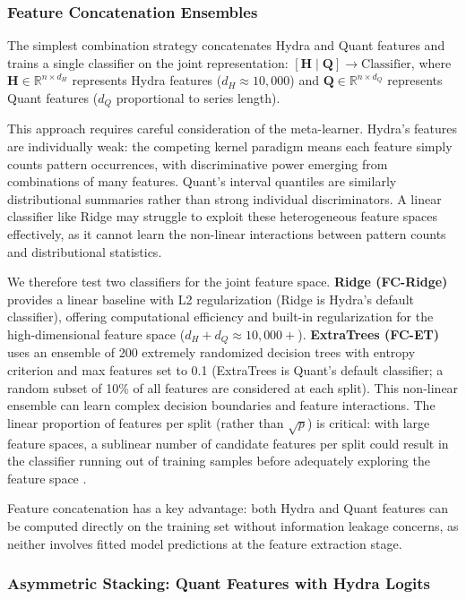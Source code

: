 \documentclass[pdflatex,sn-basic]{sn-jnl}           %
\theoremstyle{thmstyleone}%
\theoremstyle{thmstyletwo}%
\theoremstyle{thmstylethree}%
\begin{document}
\subsubsection{Feature Concatenation Ensembles}

The simplest combination strategy concatenates Hydra and Quant features and trains a single classifier on the joint representation: $[\mathbf{H} \mid \mathbf{Q}] \rightarrow \text{Classifier}$, where $\mathbf{H} \in \mathbb{R}^{n \times d_H}$ represents Hydra features ($d_H \approx 10{,}000$) and $\mathbf{Q} \in \mathbb{R}^{n \times d_Q}$ represents Quant features ($d_Q$ proportional to series length).

This approach requires careful consideration of the meta-learner. Hydra's features are individually weak: the competing kernel paradigm means each feature simply counts pattern occurrences, with discriminative power emerging from combinations of many features. Quant's interval quantiles are similarly distributional summaries rather than strong individual discriminators. A linear classifier like Ridge may struggle to exploit these heterogeneous feature spaces effectively, as it cannot learn the non-linear interactions between pattern counts and distributional statistics.

We therefore test two classifiers for the joint feature space. \textbf{Ridge (FC-Ridge)} provides a linear baseline with L2 regularization (Ridge is Hydra's default classifier), offering computational efficiency and built-in regularization for the high-dimensional feature space ($d_H + d_Q \approx 10{,}000+$). \textbf{ExtraTrees (FC-ET)} uses an ensemble of 200 extremely randomized decision trees with entropy criterion and max features set to 0.1 (ExtraTrees is Quant's default classifier; a random subset of 10\% of all features are considered at each split). This non-linear ensemble can learn complex decision boundaries and feature interactions. The linear proportion of features per split (rather than $\sqrt{p}$) is critical: with large feature spaces, a sublinear number of candidate features per split could result in the classifier running out of training samples before adequately exploring the feature space \citep{quant}.

Feature concatenation has a key advantage: both Hydra and Quant features can be computed directly on the training set without information leakage concerns, as neither involves fitted model predictions at the feature extraction stage.

\subsubsection{Asymmetric Stacking: Quant Features with Hydra Logits}
\end{document}
